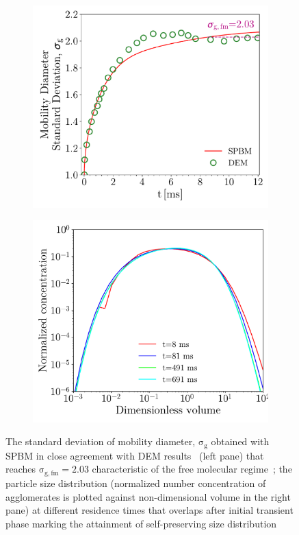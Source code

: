 \begin{figure}[!htbp]
	\centering
	\begin{subfigure}[t]{0.47\textwidth}
		\centering
		\includegraphics[width=1\textwidth]{Figures/Results/Validation/Coagulation/sigmag.pdf}
	\end{subfigure}
	\begin{subfigure}[t]{0.47\textwidth}
		\centering
		\includegraphics[width=1\textwidth]{Figures/Results/Validation/Coagulation/PSD.pdf}
	\end{subfigure}
	\caption{The standard deviation of mobility diameter, $\mathrm{\sigma_g}$ obtained with SPBM in close agreement with DEM results~\citep{kholghy2021surface} (left pane) that reaches $\mathrm{\sigma_{g,fm}=2.03}$ characteristic of the free molecular regime~\citep{vemury1995self}; the particle size distribution (normalized number concentration of agglomerates is plotted against non-dimensional volume in the right pane) at different residence times that overlaps after initial transient phase marking the attainment of self-preserving size distribution}
	\label{fig:coagvalid_sigmapsd}
\end{figure}